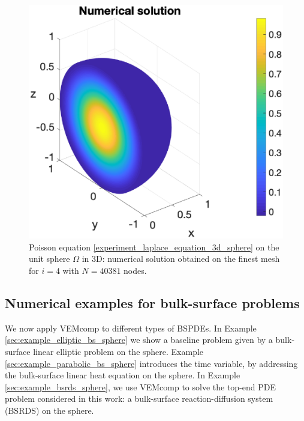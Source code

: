 \documentclass[a4paper]{article}
\begin{document}
\begin{figure}[H]
\begin{center}
\includegraphics[scale=0.5]{laplace3dsphere_Nx41.eps}
\end{center}
\caption{Poisson equation \eqref{experiment_laplace_equation_3d_sphere} on the unit sphere $\Omega$ in 3D: numerical solution obtained on the finest mesh for $i=4$ with $N= 40381$ nodes.}
\label{fig:laplace_3d_numsol_sphere}
\end{figure} 

\subsection{Numerical examples for bulk-surface problems}
We now apply VEMcomp to different types of BSPDEs.  In Example \ref{sec:example_elliptic_bs_sphere} we show a baseline problem given by a bulk-surface linear elliptic problem on the sphere. Example \ref{sec:example_parabolic_bs_sphere} introduces the time variable, by addressing the bulk-surface linear heat equation on the sphere.  In Example \ref{sec:example_bsrds_sphere}, we use VEMcomp to solve the top-end PDE problem considered in this work: a bulk-surface reaction-diffusion system (BSRDS) on the sphere.
\end{document}
